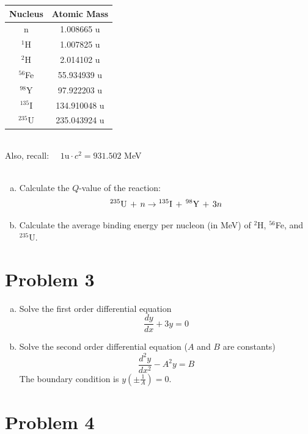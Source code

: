 \documentclass{report}
\begin{document}
\begin{table}[htbp]
	\centering
	\begin{tabular}{|c|c|}
			\hline
			Nucleus		&	Atomic Mass \\
			\hline
			n 			&	 1.008665 u \\
			$^{1}$H		& 	 1.007825 u \\
			$^{2}$H 	&	 2.014102 u \\
			$^{56}$Fe	&   55.934939 u \\
			$^{98}$Y 	&   97.922203 u \\
			$^{135}$I	&  134.910048 u \\
			$^{235}$U	&  235.043924 u \\
			\hline
	\end{tabular}
	\label{tab:design-specs}
\end{table}
\-\\
Also, recall: $\quad 1\text{u} \cdot c^{2} = 931.502$ MeV
\-\\
\-\\
\begin{enumerate}[a)]
\item Calculate the $Q$-value of the reaction:
$$ ^{235}\text{U}\, + \,n \-\rightarrow\- ^{135}\text{I}\, + \,^{98}\text{Y}\, + \,3n $$
\item Calculate the average binding energy per nucleon (in MeV) of $^{2}$H, $^{56}$Fe, and $^{235}$U.

\end{enumerate}



\newpage
\section*{Problem 3}

\begin{enumerate}[a)]
\item Solve the first order differential equation
$$ \frac{dy}{dx} + 3y = 0 $$
\item Solve the second order differential equation ($A$ and $B$ are constants)
$$ \frac{d^2 y}{dx^2} - A^2y = B $$
The boundary condition is $y(\pm\frac{1}{A}) = 0$.
\end{enumerate}



\newpage
\section*{Problem 4}
\end{document}
